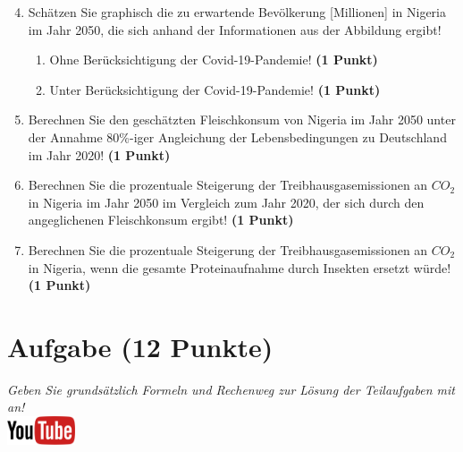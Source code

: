 \documentclass[a4paper, 9pt]{scrartcl}\usepackage[]{graphicx}\usepackage[]{xcolor}
\begin{document}
\begin{enumerate}
  \setcounter{enumi}{3}  
\item Sch{\"a}tzen Sie graphisch die zu erwartende Bev{\"o}lkerung [Millionen] in Nigeria im
  Jahr 2050, die sich anhand der Informationen aus der Abbildung ergibt!
\begin{enumerate}
\item Ohne Ber{\"u}cksichtigung der Covid-19-Pandemie! \textbf{(1
    Punkt)}
\item Unter Ber{\"u}cksichtigung der Covid-19-Pandemie! \textbf{(1
    Punkt)}
\end{enumerate}
\item Berechnen Sie den gesch{\"a}tzten Fleischkonsum von Nigeria im Jahr
  2050 unter der Annahme 80\%-iger Angleichung der Lebensbedingungen zu
  Deutschland im Jahr 2020! \textbf{(1 Punkt)}
\item Berechnen Sie die prozentuale Steigerung der Treibhausgasemissionen
  an $CO_2$ in Nigeria im Jahr 2050 im Vergleich zum Jahr 2020, der
  sich durch den angeglichenen Fleischkonsum ergibt! \textbf{(1 Punkt)}
\item Berechnen Sie die prozentuale Steigerung der Treibhausgasemissionen
  an $CO_2$ in Nigeria, wenn die gesamte Proteinaufnahme 
  durch Insekten ersetzt w{\"u}rde! \textbf{(1
    Punkt)}
\end{enumerate}







 
\clearpage

\section{Aufgabe \hfill (12 Punkte)}

\textit{Geben Sie grunds{\"a}tzlich Formeln und Rechenweg zur L{\"o}sung der
  Teilaufgaben mit an!} \\[1Ex]

\hfill\href{https://youtu.be/flRBo1FWQy0}{\includegraphics[width = 2cm]{img/youtube}} %
\hspace{2Ex}
\end{document}
